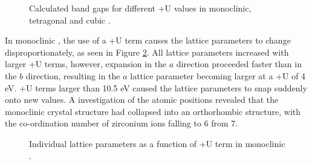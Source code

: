 \begin{figure}[ht] %
\begin{center}
		\caption{Calculated band gaps for different +U values in monoclinic, tetragonal and cubic \zirconia .}
		\label{Figure:plusubandgap}
	\end{center}
\end{figure}

In monoclinic \zirconia , the use of a +U term causes the lattice parameters to change disproportionately, as seen in Figure \ref{Figure:plusumono}. All lattice parameters increased with larger +U terms, however, expansion in the $a$ direction proceeded faster than in the $b$ direction, resulting in the $a$ lattice parameter becoming larger at a +U of 4 eV. +U terms larger than 10.5 eV caused the lattice parameters to snap suddenly onto new values. A  investigation of the atomic positions revealed that the monoclinic crystal structure had collapsed into an orthorhombic structure, with the co-ordination number of zirconium ions falling to 6 from 7.

\begin{figure} %
\begin{center}
		\caption{Individual lattice parameters as a function of +U term in monoclinic \zirconia .}
		\label{Figure:plusumono}
	\end{center}
\end{figure}

